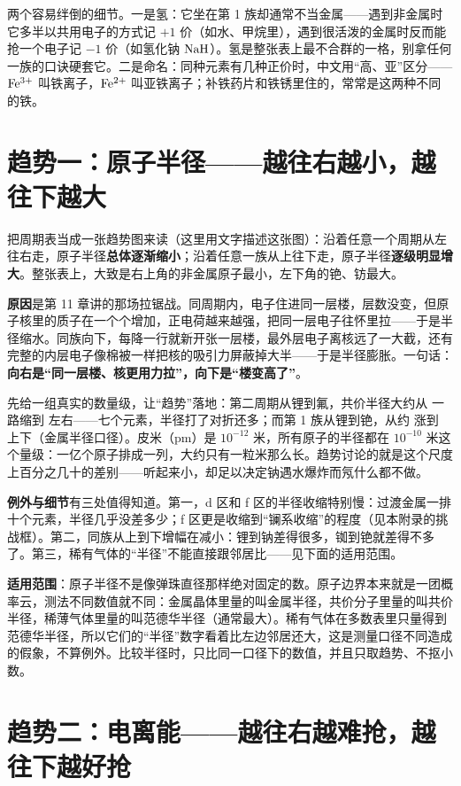 两个容易绊倒的细节。一是氢：它坐在第 1 族却通常不当金属——遇到非金属时它多半以共用电子的方式记 $+1$ 价（如水、甲烷里），遇到很活泼的金属时反而能抢一个电子记 $-1$ 价（如氢化钠 $\mathrm{NaH}$）。氢是整张表上最不合群的一格，别拿任何一族的口诀硬套它。二是命名：同种元素有几种正价时，中文用“高、亚”区分——$\mathrm{Fe^{3+}}$ 叫铁离子，$\mathrm{Fe^{2+}}$ 叫亚铁离子；补铁药片和铁锈里住的，常常是这两种不同的铁。

\section{趋势一：原子半径——越往右越小，越往下越大}

把周期表当成一张趋势图来读（这里用文字描述这张图）：沿着任意一个周期从左往右走，原子半径\textbf{总体逐渐缩小}；沿着任意一族从上往下走，原子半径\textbf{逐级明显增大}。整张表上，大致是右上角的非金属原子最小，左下角的铯、钫最大。

\textbf{原因}是第 11 章讲的那场拉锯战。同周期内，电子住进同一层楼，层数没变，但原子核里的质子在一个个增加，正电荷越来越强，把同一层电子往怀里拉——于是半径缩水。同族向下，每降一行就新开张一层楼，最外层电子离核远了一大截，还有完整的内层电子像棉被一样把核的吸引力屏蔽掉大半——于是半径膨胀。一句话：\textbf{向右是“同一层楼、核更用力拉”，向下是“楼变高了”}。

先给一组真实的数量级，让“趋势”落地：第二周期从锂到氟，共价半径大约从  一路缩到  左右——七个元素，半径打了对折还多；而第 1 族从锂到铯，从约  涨到  上下（金属半径口径）。皮米（pm）是 $10^{-12}$ 米，所有原子的半径都在 $10^{-10}$ 米这个量级：一亿个原子排成一列，大约只有一粒米那么长。趋势讨论的就是这个尺度上百分之几十的差别——听起来小，却足以决定钠遇水爆炸而氖什么都不做。

\textbf{例外与细节}有三处值得知道。第一，d 区和 f 区的半径收缩特别慢：过渡金属一排十个元素，半径几乎没差多少；f 区更是收缩到“镧系收缩”的程度（见本附录的挑战框）。第二，同族从上到下增幅在减小：锂到钠差得很多，铷到铯就差得不多了。第三，稀有气体的“半径”不能直接跟邻居比——见下面的适用范围。

\textbf{适用范围}：原子半径不是像弹珠直径那样绝对固定的数。原子边界本来就是一团概率云，测法不同数值就不同：金属晶体里量的叫金属半径，共价分子里量的叫共价半径，稀薄气体里量的叫范德华半径（通常最大）。稀有气体在多数表里只量得到范德华半径，所以它们的“半径”数字看着比左边邻居还大，这是测量口径不同造成的假象，不算例外。比较半径时，只比同一口径下的数值，并且只取趋势、不抠小数。

\section{趋势二：电离能——越往右越难抢，越往下越好抢}

